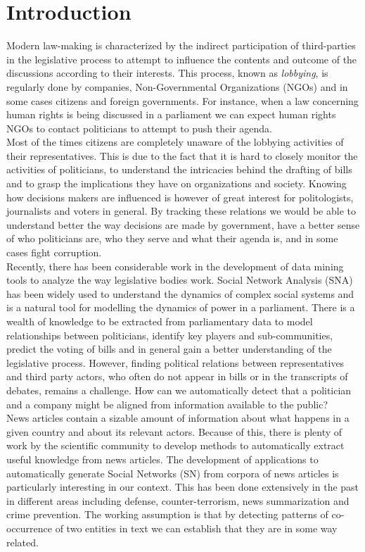 \section{Introduction}\label{sec:intro}

Modern law-making is characterized by the indirect participation of third-parties in the legislative process to attempt to influence the contents and outcome of the discussions according to their interests. This process, known as \emph{lobbying}, is regularly done by companies, Non-Governmental Organizations (NGOs) and in some cases citizens and foreign governments. For instance, when a law concerning human rights is being discussed in a parliament we can expect human rights NGOs to contact politicians to attempt to push their agenda. \\

Most of the times citizens are completely unaware of the lobbying activities of their representatives. This is due to the fact that it is hard to closely monitor the activities of politicians, to understand the intricacies behind the drafting of bills and to grasp the implications they have on organizations and society. Knowing how decisions makers are influenced is however of great interest for politologists, journalists and voters in general. By tracking these relations we would be able to understand better the way decisions are made by government, have a better sense of who politicians are, who they serve and what their agenda is, and in some cases fight corruption. \\

Recently, there has been considerable work in the development of data mining tools to analyze the way legislative bodies work. Social Network Analysis (SNA) has been widely used to understand the dynamics of complex social systems and is a natural tool for modelling the dynamics of power in a parliament. There is a wealth of knowledge to be extracted from parliamentary data to model relationships between politicians, identify key players and sub-communities, predict the voting of bills and in general gain a better understanding of the legislative process. However, finding political relations between representatives and third party actors, who often do not appear in bills or in the transcripts of debates, remains a challenge. How can we automatically detect that a politician and a company might be aligned from information available to the public? \\

News articles contain a sizable amount of information about what happens in a given country and about its relevant actors. Because of this, there is plenty of work by the scientific community to develop methods to automatically extract useful knowledge from news articles. The development of applications to automatically generate Social Networks (SN) from corpora of news articles is particularly interesting in our context. This has been done extensively in the past in different areas including defense, counter-terrorism, news summarization and crime prevention. The working assumption is that by detecting patterns of co-occurrence of two entities in text we can establish that they are in some way related.  \\

